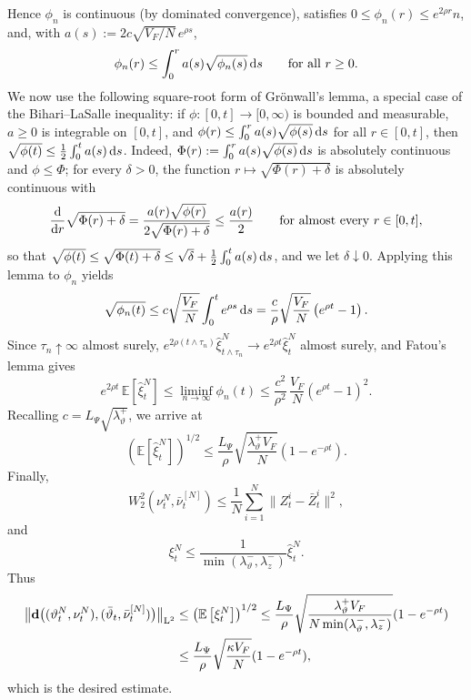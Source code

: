 Hence \(\phi_n\) is continuous (by dominated convergence), satisfies \(0\le\phi_n(r)\le e^{2\rho r}n\), and, with \(a(s):=2c\sqrt{V_F/N}\,e^{\rho s}\),
\[
    \phi_n(r)\le\int_0^r a(s)\sqrt{\phi_n(s)}\,\md s
    \qquad\text{for all } r\ge0 .
\]
We now use the following square-root form of Gr\"onwall's lemma, a special case of the Bihari--LaSalle inequality: if \(\phi:[0,t]\to[0,\infty)\) is bounded and measurable, \(a\ge0\) is integrable on \([0,t]\), and \(\phi(r)\le\int_0^r a(s)\sqrt{\phi(s)}\,\md s\) for all \(r\in[0,t]\), then \(\sqrt{\phi(t)}\le\frac12\int_0^t a(s)\,\md s\). Indeed, \(\Phi(r):=\int_0^r a(s)\sqrt{\phi(s)}\,\md s\) is absolutely continuous and \(\phi\le\Phi\); for every \(\delta>0\), the function \(r\mapsto\sqrt{\Phi(r)+\delta}\) is absolutely continuous with
\[
    \frac{\md}{\md r}\sqrt{\Phi(r)+\delta}
    =
    \frac{a(r)\sqrt{\phi(r)}}{2\sqrt{\Phi(r)+\delta}}
    \le
    \frac{a(r)}{2}
    \qquad\text{for almost every } r\in[0,t],
\]
so that \(\sqrt{\phi(t)}\le\sqrt{\Phi(t)+\delta}\le\sqrt\delta+\frac12\int_0^t a(s)\,\md s\), and we let \(\delta\downarrow0\). Applying this lemma to \(\phi_n\) yields
\[
    \sqrt{\phi_n(t)}
    \le
    c\sqrt{\frac{V_F}{N}}\int_0^t e^{\rho s}\,\md s
    =
    \frac{c}{\rho}\sqrt{\frac{V_F}{N}}\left(e^{\rho t}-1\right).
\]
Since \(\tau_n\uparrow\infty\) almost surely, \(e^{2\rho(t\wedge\tau_n)}\widehat\xi^N_{t\wedge\tau_n}\to e^{2\rho t}\widehat\xi_t^N\) almost surely, and Fatou's lemma gives
\[
    e^{2\rho t}\,\mathbb E\left[\widehat\xi_t^N\right]
    \le
    \liminf_{n\to\infty}\phi_n(t)
    \le
    \frac{c^2}{\rho^2}\,\frac{V_F}{N}\left(e^{\rho t}-1\right)^2 .
\]
Recalling \(c=L_\Psi\sqrt{\lambda_\vartheta^+}\), we arrive at
\[
    \left(\mathbb E\left[\widehat\xi^N_t\right]\right)^{1/2}
    \le
    \frac{L_\Psi}{\rho}\sqrt{\frac{\lambda^+_\vartheta V_F}{N}}\left(1-e^{-\rho t}\right).
\]
%
Finally,
\[
    W_2^2(\nu_t^N,\bar\nu_t^{[N]})
    \le
    \frac1N\sum_{i=1}^N\|Z_t^i-\bar Z_t^i\|^2,
\]
and
\[
    \xi_t^N
    \le
    \frac{1}{\min(\lambda_\vartheta^-,{\lambda_z^-})}
    \widehat\xi_t^N.
\]
Thus
\begin{align*}
    \Ltwonorm[\big]{\mathbf d\big((\vartheta_t^N,\nu_t^N),(\bar\vartheta_t,\bar\nu_t^{[N]})\big)}
    &\mathrel{\le}
    \left(\mathbb E\left[\xi_t^N\right]\right)^{1/2}
    \le
    \frac{L_\Psi}{\rho}
    \sqrt{
        \frac{\lambda_\vartheta^+V_F}
             {N\min(\lambda_\vartheta^-,{\lambda_z^-})}
    }
    (1-e^{-\rho t})\\
    &\le
    \frac{L_\Psi}{\rho}
    \sqrt{\frac{\kappa V_F}{N}}
    (1-e^{-\rho t}),
\end{align*}
which is the desired estimate.

